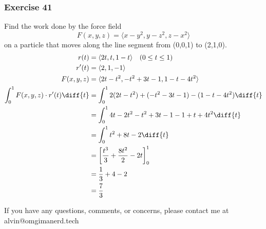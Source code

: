 \documentclass{math}
\begin{document}
\subsubsection*{Exercise 41}
Find the work done by the force field
\[ F(x,y,z) = \langle x-y^2,y-z^2,z-x^2\rangle \]
on a particle that moves along the line segment from (0,0,1) to (2,1,0).
\begin{align*}
  r(t) &= \langle2t,t,1-t\rangle \quad (0\le t\le1) \\
  r'(t) &= \langle2,1,-1\rangle \\
  F(x,y,z) &= \langle2t-t^2,-t^2+3t-1,1-t-4t^2\rangle \\
  \int_{0}^{1}F(x,y,z)\cdot r'(t)\diff{t} &= \int_{0}^{1}
    2(2t-t^2)+(-t^2-3t-1)-(1-t-4t^2)\diff{t} \\
  &= \int_{0}^{1}4t-2t^2-t^2+3t-1-1+t+4t^2\diff{t} \\
  &= \int_{0}^{1}t^2+8t-2\diff{t} \\
  &= \bigg[\frac{t^3}{3}+\frac{8t^2}{2}-2t\bigg]_{0}^{1} \\
  &= \frac{1}{3}+4-2 \\
  &= \frac{7}{3}
\end{align*}

\begin{center}
  If you have any questions, comments, or concerns, please contact me at
  alvin@omgimanerd.tech
\end{center}
\end{document}

